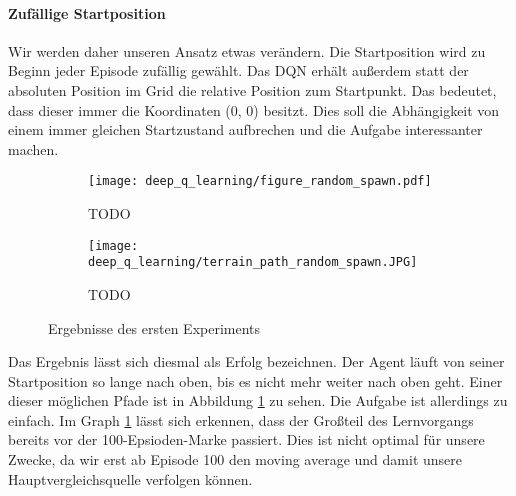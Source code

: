 \paragraph{Zufällige Startposition}
Wir werden daher unseren Ansatz etwas verändern. Die Startposition wird zu Beginn jeder Episode zufällig gewählt. Das DQN erhält außerdem statt der absoluten Position im Grid die relative Position zum Startpunkt. Das bedeutet, dass dieser immer die Koordinaten (0, 0) besitzt. Dies soll die Abhängigkeit von einem immer gleichen Startzustand aufbrechen und die Aufgabe interessanter machen.
\begin{figure}[H]
    \centering
    \begin{subfigure}[b]{0.49\textwidth}
        \texttt{[image: deep\_q\_learning/figure\_random\_spawn.pdf]}
        \caption{TODO}
        \label{img:graphDeepQRandomSpawn}
    \end{subfigure}
    \begin{subfigure}[b]{0.49\textwidth}
        \texttt{[image: deep\_q\_learning/terrain\_path\_random\_spawn.JPG]}
        \caption{TODO}
        \label{img:pathDeepQRandomSpawn}
    \end{subfigure}
    \caption{Ergebnisse des ersten Experiments}
\end{figure}
Das Ergebnis lässt sich diesmal als Erfolg bezeichnen. Der Agent läuft von seiner Startposition so lange nach oben, bis es nicht mehr weiter nach oben geht. Einer dieser möglichen Pfade ist in Abbildung \ref{img:graphDeepQRandomSpawn} zu sehen. Die Aufgabe ist allerdings zu einfach. Im Graph \ref{img:graphDeepQRandomSpawn} lässt sich erkennen, dass der Großteil des Lernvorgangs bereits vor der 100-Epsioden-Marke passiert. Dies ist nicht optimal für unsere Zwecke, da wir erst ab Episode 100 den moving average und damit unsere Hauptvergleichsquelle verfolgen können.

